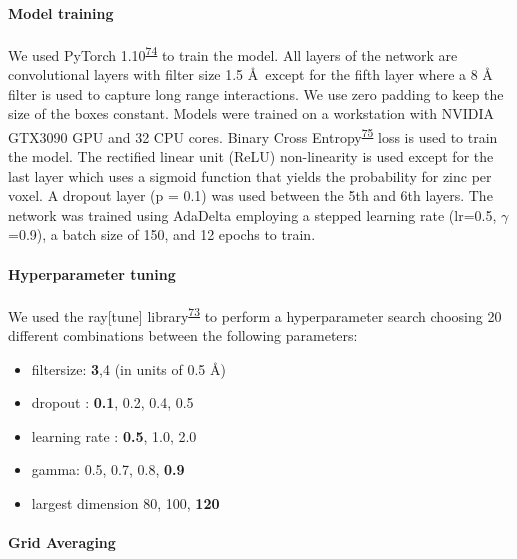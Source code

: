 \documentclass[  ASAPversion,
  ,
  9pt]{elife}
\providecommand{\tightlist}{%
  \setlength{\itemsep}{0pt}\setlength{\parskip}{0pt}}
\begin{document}
\hypertarget{model-training}{%
\paragraph{Model training}\label{model-training}}

We used PyTorch 1.10\textsuperscript{\protect\hyperlink{ref-iOWq2JB8}{74}} to train the model. All layers of the network are convolutional layers with filter size 1.5 \AA\, except for the fifth layer where a 8 \AA\, filter is used to capture long range interactions. We use zero padding to keep the size of the boxes constant. Models were trained on a workstation with NVIDIA GTX3090 GPU and 32 CPU cores. Binary Cross Entropy\textsuperscript{\protect\hyperlink{ref-hchMCnC1}{75}} loss is used to train the model. The rectified linear unit (ReLU) non-linearity is used except for the last layer which uses a sigmoid function that yields the probability for zinc per voxel. A dropout layer (p = 0.1) was used between the 5th and 6th layers. The network was trained using AdaDelta employing a stepped learning rate (lr=0.5, $\gamma$=0.9), a batch size of 150, and 12 epochs to train.

\hypertarget{hyperparameter-tuning}{%
\paragraph{Hyperparameter tuning}\label{hyperparameter-tuning}}

We used the ray{[}tune{]} library\textsuperscript{\protect\hyperlink{ref-19MS2ZVR1}{73}} to perform a hyperparameter search choosing 20 different combinations between the following parameters:

\begin{itemize}
\tightlist
\item
  filtersize: \textbf{3},4 (in units of 0.5 \AA )
\item
  dropout : \textbf{0.1}, 0.2, 0.4, 0.5
\item
  learning rate : \textbf{0.5}, 1.0, 2.0
\item
  gamma: 0.5, 0.7, 0.8, \textbf{0.9}
\item
  largest dimension 80, 100, \textbf{120}
\end{itemize}

\hypertarget{grid-averaging}{%
\paragraph{Grid Averaging}\label{grid-averaging}}
\end{document}
